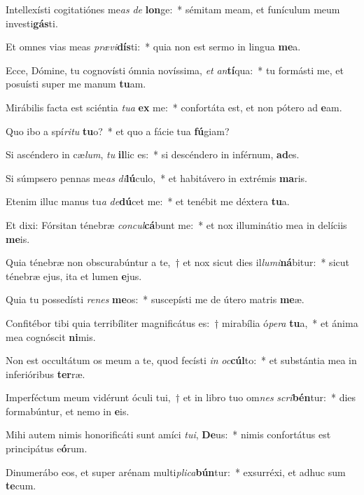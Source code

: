 \item Intellexísti cogitatiónes me\textit{as} \textit{de} \textbf{lon}ge:~* sémitam meam, et funículum meum investi\textbf{gás}ti.
\item Et omnes vias meas \textit{præ}\textit{vi}\textbf{dís}ti:~* quia non est sermo in lingua \textbf{me}a.
\item Ecce, Dómine, tu cognovísti ómnia novíssima, \textit{et} \textit{an}\textbf{tí}qua:~* tu formásti me, et posuísti super me manum \textbf{tu}am.
\item Mirábilis facta est sciéntia \textit{tu}\textit{a} \textbf{ex} me:~* confortáta est, et non pótero ad \textbf{e}am.
\item Quo ibo a spí\textit{ri}\textit{tu} \textbf{tu}o?~* et quo a fácie tua \textbf{fú}giam?
\item Si ascéndero in cæ\textit{lum}, \textit{tu} \textbf{il}lic es:~* si descéndero in inférnum, \textbf{ad}es.
\item Si súmpsero pennas me\textit{as} \textit{di}\textbf{lú}culo,~* et habitávero in extrémis \textbf{ma}ris.
\item Etenim illuc manus tu\textit{a} \textit{de}\textbf{dú}cet me:~* et tenébit me déxtera \textbf{tu}a.
\item Et dixi: Fórsitan ténebræ \textit{con}\textit{cul}\textbf{cá}bunt me:~* et nox illuminátio mea in delíciis \textbf{me}is.
\item Quia ténebræ non obscurabúntur a te,~† et nox sicut dies il\textit{lu}\textit{mi}\textbf{ná}bitur:~* sicut ténebræ ejus, ita et lumen \textbf{e}jus.
\item Quia tu possedísti \textit{re}\textit{nes} \textbf{me}os:~* suscepísti me de útero matris \textbf{me}æ.
\item Confitébor tibi quia terribíliter magnificátus es:~† mirabília ó\textit{pe}\textit{ra} \textbf{tu}a,~* et ánima mea cognóscit \textbf{ni}mis.
\item Non est occultátum os meum a te, quod fecísti \textit{in} \textit{oc}\textbf{cúl}to:~* et substántia mea in inferióribus \textbf{ter}ræ.
\item Imperféctum meum vidérunt óculi tui,~† et in libro tuo om\textit{nes} \textit{scri}\textbf{bén}tur:~* dies formabúntur, et nemo in \textbf{e}is.
\item Mihi autem nimis honorificáti sunt amíci \textit{tu}\textit{i}, \textbf{De}us:~* nimis confortátus est principátus e\textbf{ó}rum.
\item Dinumerábo eos, et super arénam multi\textit{pli}\textit{ca}\textbf{bún}tur:~* exsurréxi, et adhuc sum \textbf{te}cum.
